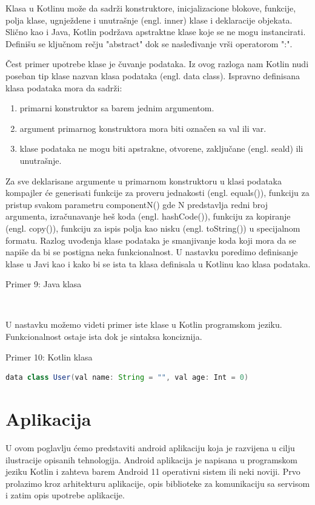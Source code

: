 \documentclass[12pt,oneside]{memoir}
\begin{document}
Klasa u Kotlinu može da sadrži konstruktore, inicjalizacione blokove, funkcije, polja klase, ugnježdene i unutrašnje (engl. inner) klase i deklaracije objekata. Slično kao i Java, Kotlin podržava apstraktne klase koje se ne mogu instancirati. Definišu se ključnom rečju "abstract" dok se nasleđivanje vrši operatorom ":".
 
Čest primer upotrebe klase je čuvanje podataka. Iz ovog razloga nam Kotlin nudi poseban tip klase nazvan klasa podataka (engl. data class). Ispravno definisana klasa podataka mora da sadrži:
\begin{enumerate}
  \item primarni konstruktor sa barem jednim argumentom.
  \item argument primarnog konstruktora mora biti označen sa val ili var.
  \item klase podataka ne mogu biti apstrakne, otvorene, zaključane (engl. seald) ili unutrašnje.
\end{enumerate}


Za sve deklarisane argumente u primarnom konstruktoru u klasi podataka kompajler će generisati funkcije za proveru jednakosti (engl. equals()), funkciju za pristup svakom parametru componentN() gde N predstavlja redni broj argumenta, izračunavanje heš koda (engl. hashCode()), funkciju za kopiranje (engl. copy()), funkciju za ispis polja kao nisku (engl. toString()) u specijalnom formatu. Razlog uvođenja klase podataka je smanjivanje koda koji mora da se napiše da bi se postigna neka funkcionalnost. U nastavku poredimo definisanje klase u Javi kao i kako bi se ista ta klasa definisala u Kotlinu kao klasa podataka.

\begin{center} Primer 9: Java klasa\end{center}
\begin{lstlisting}
 
\end{lstlisting}
U nastavku možemo videti primer iste klase u Kotlin programskom jeziku. Funkcionalnost ostaje ista dok je sintaksa konciznija.
\begin{center} Primer 10: Kotlin klasa\end{center}
\begin{lstlisting}[language=Java]
data class User(val name: String = "", val age: Int = 0)
\end{lstlisting}

\section{Aplikacija}
U ovom poglavlju ćemo predstaviti android aplikaciju koja je razvijena u cilju ilustracije opisanih tehnologija. Android aplikacija je napisana u programskom jeziku Kotlin i zahteva barem Android 11 operativni sistem ili neki noviji. Prvo prolazimo kroz arhitekturu aplikacije, opis biblioteke za komunikaciju sa servisom i zatim opis upotrebe aplikacije.
 
\end{document}
